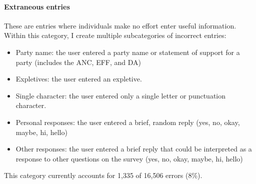 \documentclass[12pt]{article}
\begin{document}
\paragraph{Extraneous entries} These are entries where individuals make no effort enter useful information. Within this category, I create multiple subcategories of incorrect entries: 
\begin{itemize}
\item Party name: the user entered a party name or statement of support for a party (includes the ANC, EFF, and DA)
\item Expletives: the user entered an expletive. 
\item Single character: the user entered only a single letter or punctuation character. 
\item Personal responses: the user entered a brief, random reply (yes, no, okay, maybe, hi, hello) 
\item Other responses: the user entered a brief reply that could be interpreted as a response to other questions on the survey (yes, no, okay, maybe, hi, hello) 

\end{itemize}
This category currently accounts for  1,335 of 16,506 errors (8\%). 

\iffalse
\begin{tabular}{ r|c|c| }
\multicolumn{1}{r}{}
 &  \multicolumn{1}{c}{}
 & \multicolumn{1}{c}{} \\
\cline{2-3}
 &  &  \\
\cline{2-3}
 &  &  \\
\cline{2-3}
\end{tabular}
\fi
\end{document}
